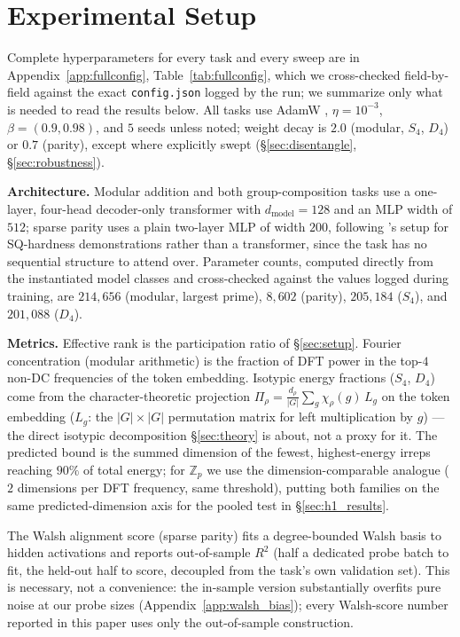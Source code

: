 \documentclass{article}
\begin{document}
\section{Experimental Setup}
\label{sec:expsetup}

Complete hyperparameters for every task and every sweep are in
Appendix~\ref{app:fullconfig}, Table~\ref{tab:fullconfig}, which we
cross-checked field-by-field against the exact \texttt{config.json} logged
by the run; we summarize only what is needed to read the results below.
All tasks use AdamW \citep{loshchilov2019decoupled}, $\eta=10^{-3}$,
$\beta=(0.9,0.98)$, and $5$ seeds unless noted; weight decay is $2.0$
(modular, $S_4$, $D_4$) or $0.7$ (parity), except where explicitly swept
(\S\ref{sec:disentangle}, \S\ref{sec:robustness}).

\textbf{Architecture.} Modular addition and both group-composition tasks use
a one-layer, four-head decoder-only transformer
\citep{vaswani2017attention} with $d_{\mathrm{model}}=128$ and an MLP width
of $512$; sparse parity uses a plain two-layer MLP of width $200$, following
\citet{barak2022hidden}'s setup for SQ-hardness demonstrations rather than a
transformer, since the task has no sequential structure to attend over.
Parameter counts, computed directly from the instantiated model classes and
cross-checked against the values logged during training, are $214{,}656$
(modular, largest prime), $8{,}602$ (parity), $205{,}184$ ($S_4$), and
$201{,}088$ ($D_4$).

\textbf{Metrics.} Effective rank is the participation ratio of
\S\ref{sec:setup}. Fourier concentration (modular arithmetic) is the
fraction of DFT power in the top-$4$ non-DC frequencies of the token
embedding. Isotypic energy fractions ($S_4$, $D_4$) come from the
character-theoretic projection $\Pi_\rho = \frac{d_\rho}{|G|}\sum_{g}
\chi_\rho(g)\,L_g$ on the token embedding ($L_g$: the $|G|\times|G|$
permutation matrix for left multiplication by $g$) --- the direct
isotypic decomposition \S\ref{sec:theory} is about, not a proxy for it.
The predicted bound is the summed dimension of the fewest, highest-energy
irreps reaching $90\%$ of total energy; for $\mathbb{Z}_p$ we use the
dimension-comparable analogue ($2$ dimensions per DFT frequency, same
threshold), putting both families on the same predicted-dimension axis
for the pooled test in \S\ref{sec:h1_results}.

The Walsh alignment score (sparse parity) fits a degree-bounded Walsh
basis to hidden activations and reports out-of-sample $R^2$ (half a
dedicated probe batch to fit, the held-out half to score, decoupled from
the task's own validation set). This is necessary, not a convenience: the
in-sample version substantially overfits pure noise at our probe sizes
(Appendix~\ref{app:walsh_bias}); every Walsh-score number reported in
this paper uses only the out-of-sample construction.
\end{document}
